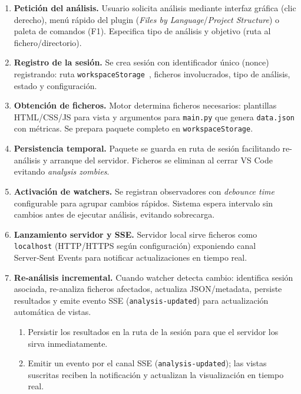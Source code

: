 \documentclass[a4paper, 12pt]{book}
\begin{document}
\begin{enumerate}
  \item \textbf{Petición del análisis.} Usuario solicita análisis mediante interfaz gráfica (clic derecho), menú rápido del plugin (\emph{Files by Language}/\emph{Project Structure}) o paleta de comandos (F1). Especifica tipo de análisis y objetivo (ruta al fichero/directorio).

  \item \textbf{Registro de la sesión.} Se crea sesión con identificador único (nonce) registrando: ruta \texttt{workspaceStorage}~\cite{vscode-storage}, ficheros involucrados, tipo de análisis, estado y configuración.

  \item \textbf{Obtención de ficheros.} Motor determina ficheros necesarios: plantillas HTML/CSS/JS para vista y argumentos para \texttt{main.py} que genera \texttt{data.json} con métricas. Se prepara paquete completo en \texttt{workspaceStorage}.
  
  \item \textbf{Persistencia temporal.} Paquete se guarda en ruta de sesión facilitando re-análisis y arranque del servidor. Ficheros se eliminan al cerrar VS Code evitando \emph{analysis zombies}.
  
  \item \textbf{Activación de watchers.} Se registran observadores con \emph{debounce time} configurable para agrupar cambios rápidos. Sistema espera intervalo sin cambios antes de ejecutar análisis, evitando sobrecarga.
  
  \item \textbf{Lanzamiento servidor y SSE.} Servidor local sirve ficheros como \texttt{localhost} (HTTP/HTTPS según configuración) exponiendo canal Server‑Sent Events para notificar actualizaciones en tiempo real.
  
  \item \textbf{Re‑análisis incremental.} Cuando watcher detecta cambio: identifica sesión asociada, re-analiza ficheros afectados, actualiza JSON/metadata, persiste resultados y emite evento SSE (\texttt{analysis-updated}) para actualización automática de vistas.

    \begin{enumerate}
      \item Persistir los resultados en la ruta de la sesión para que el servidor los sirva inmediatamente.
      \item Emitir un evento por el canal SSE (\texttt{analysis-updated}); las vistas suscritas reciben la notificación y actualizan la visualización en tiempo real.
    \end{enumerate}
\end{enumerate}
\end{document}
